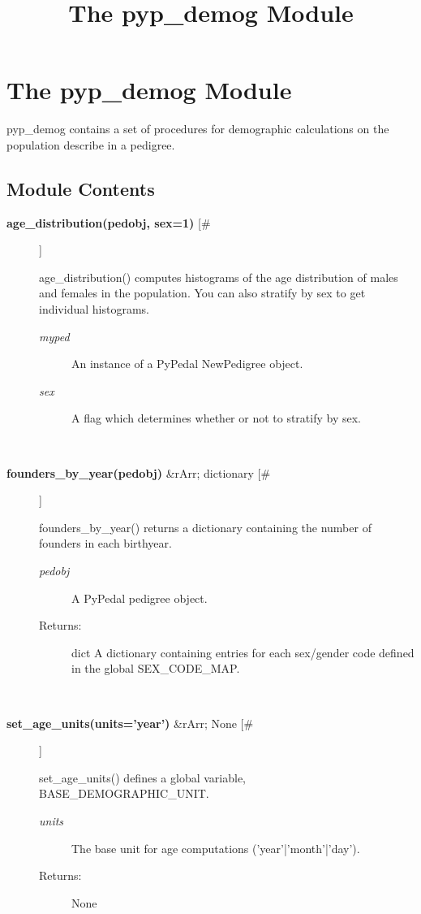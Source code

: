 \documentclass[10pt]{article}
\title{The pyp\_demog Module}
\begin{document}
\section*{The pyp\_demog Module}


 pyp\_demog contains a set of procedures for demographic calculations on the population describe in a pedigree.
\subsection*{Module Contents}
\begin{description}
\item[\textbf{age\_distribution(pedobj, sex=1)}
 [\#]]

 age\_distribution() computes histograms of the age distribution of males and females in the population. You can also stratify by sex to get individual histograms.
\begin{description}
\item[\emph{myped}
] An instance of a PyPedal NewPedigree object.
\item[\emph{sex}
] A flag which determines whether or not to stratify by sex.

\end{description}
\\ 

\item[\textbf{founders\_by\_year(pedobj)}
 \&rArr; dictionary [\#]]

 founders\_by\_year() returns a dictionary containing the number of founders in each birthyear.
\begin{description}
\item[\emph{pedobj}
] A PyPedal pedigree object.
\item[Returns:] dict A dictionary containing entries for each sex/gender code defined in the global SEX\_CODE\_MAP.

\end{description}
\\ 

\item[\textbf{set\_age\_units(units='year')}
 \&rArr; None [\#]]

 set\_age\_units() defines a global variable, BASE\_DEMOGRAPHIC\_UNIT.
\begin{description}
\item[\emph{units}
] The base unit for age computations ('year'|'month'|'day').
\item[Returns:] None

\end{description}
\\ 


\end{description}
\end{document}
